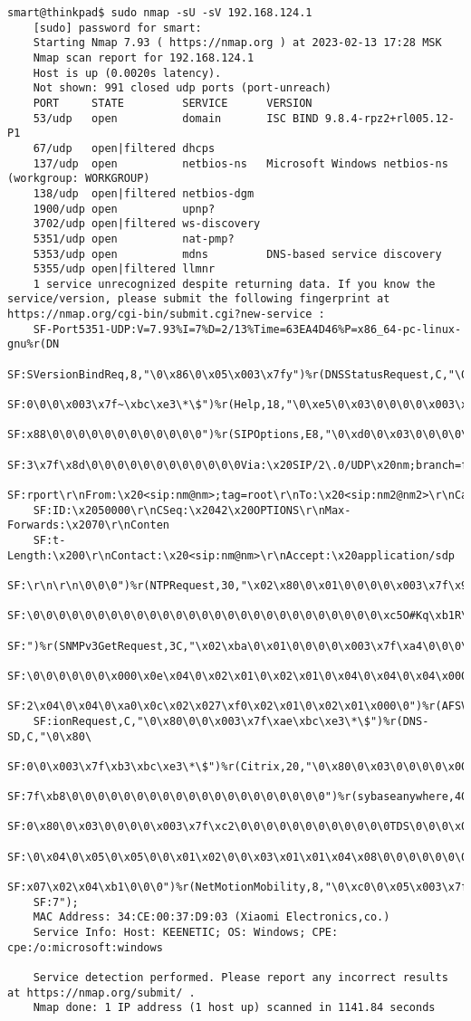\begin{Verbatim}[frame=single,breaklines=true,breakanywhere=true]
    smart@thinkpad$ sudo nmap -sU -sV 192.168.124.1
    [sudo] password for smart: 
    Starting Nmap 7.93 ( https://nmap.org ) at 2023-02-13 17:28 MSK
    Nmap scan report for 192.168.124.1
    Host is up (0.0020s latency).
    Not shown: 991 closed udp ports (port-unreach)
    PORT     STATE         SERVICE      VERSION
    53/udp   open          domain       ISC BIND 9.8.4-rpz2+rl005.12-P1
    67/udp   open|filtered dhcps
    137/udp  open          netbios-ns   Microsoft Windows netbios-ns (workgroup: WORKGROUP)
    138/udp  open|filtered netbios-dgm
    1900/udp open          upnp?
    3702/udp open|filtered ws-discovery
    5351/udp open          nat-pmp?
    5353/udp open          mdns         DNS-based service discovery
    5355/udp open|filtered llmnr
    1 service unrecognized despite returning data. If you know the service/version, please submit the following fingerprint at https://nmap.org/cgi-bin/submit.cgi?new-service :
    SF-Port5351-UDP:V=7.93%I=7%D=2/13%Time=63EA4D46%P=x86_64-pc-linux-gnu%r(DN
    SF:SVersionBindReq,8,"\0\x86\0\x05\x003\x7fy")%r(DNSStatusRequest,C,"\0\x8
    SF:0\0\0\x003\x7f~\xbc\xe3\*\$")%r(Help,18,"\0\xe5\0\x03\0\0\0\0\x003\x7f\
    SF:x88\0\0\0\0\0\0\0\0\0\0\0\0")%r(SIPOptions,E8,"\0\xd0\0\x03\0\0\0\0\x00
    SF:3\x7f\x8d\0\0\0\0\0\0\0\0\0\0\0\0Via:\x20SIP/2\.0/UDP\x20nm;branch=foo;
    SF:rport\r\nFrom:\x20<sip:nm@nm>;tag=root\r\nTo:\x20<sip:nm2@nm2>\r\nCall-
    SF:ID:\x2050000\r\nCSeq:\x2042\x20OPTIONS\r\nMax-Forwards:\x2070\r\nConten
    SF:t-Length:\x200\r\nContact:\x20<sip:nm@nm>\r\nAccept:\x20application/sdp
    SF:\r\n\r\n\0\0\0")%r(NTPRequest,30,"\x02\x80\0\x01\0\0\0\0\x003\x7f\x9a\0
    SF:\0\0\0\0\0\0\0\0\0\0\0\0\0\0\0\0\0\0\0\0\0\0\0\0\0\0\0\xc5O#Kq\xb1R\xf3
    SF:")%r(SNMPv3GetRequest,3C,"\x02\xba\0\x01\0\0\0\0\x003\x7f\xa4\0\0\0\0\0
    SF:\0\0\0\0\0\0\x000\x0e\x04\0\x02\x01\0\x02\x01\0\x04\0\x04\0\x04\x000\x1
    SF:2\x04\0\x04\0\xa0\x0c\x02\x027\xf0\x02\x01\0\x02\x01\x000\0")%r(AFSVers
    SF:ionRequest,C,"\0\x80\0\0\x003\x7f\xae\xbc\xe3\*\$")%r(DNS-SD,C,"\0\x80\
    SF:0\0\x003\x7f\xb3\xbc\xe3\*\$")%r(Citrix,20,"\0\x80\0\x03\0\0\0\0\x003\x
    SF:7f\xb8\0\0\0\0\0\0\0\0\0\0\0\0\0\0\0\0\0\0\0\0")%r(sybaseanywhere,40,"\
    SF:0\x80\0\x03\0\0\0\0\x003\x7f\xc2\0\0\0\0\0\0\0\0\0\0\0\0TDS\0\0\0\x01\0
    SF:\0\x04\0\x05\0\x05\0\0\x01\x02\0\0\x03\x01\x01\x04\x08\0\0\0\0\0\0\0\0\
    SF:x07\x02\x04\xb1\0\0\0")%r(NetMotionMobility,8,"\0\xc0\0\x05\x003\x7f\xc
    SF:7");
    MAC Address: 34:CE:00:37:D9:03 (Xiaomi Electronics,co.)
    Service Info: Host: KEENETIC; OS: Windows; CPE: cpe:/o:microsoft:windows

    Service detection performed. Please report any incorrect results at https://nmap.org/submit/ .
    Nmap done: 1 IP address (1 host up) scanned in 1141.84 seconds
\end{Verbatim}

